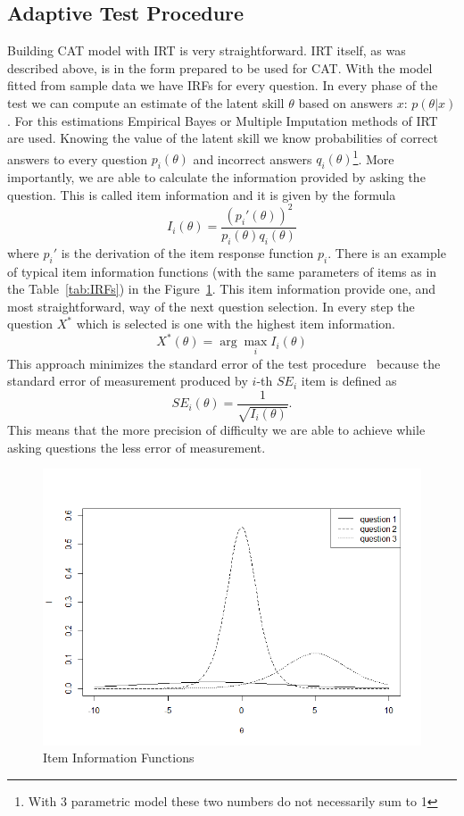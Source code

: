 \subsection{Adaptive Test Procedure}
Building CAT model with IRT is very straightforward. IRT itself, as was described above, is in the form prepared to be used for CAT. With the model fitted from sample data we have IRFs for every question. In every phase of the test we can compute an estimate of the latent skill $\theta$ based on answers $x$: $p(\theta|x)$. For this estimations Empirical Bayes or Multiple Imputation methods of IRT are used. Knowing the value of the latent skill we know probabilities of correct answers to every question $p_i(\theta)$ and incorrect answers $q_i(\theta)$\footnote{With 3 parametric model these two numbers do not necessarily sum to 1}. More importantly, we are able to calculate the information provided by asking the question. This is called item information and it is given by the formula
$$I_i(\theta)=\frac{(p_i'(\theta))^2}{p_i(\theta)q_i(\theta)}$$
where $p_i'$ is the derivation of the item response function $p_i$. There is an example of typical item information functions (with the same parameters of items as in the Table~\ref{tab:IRFs}) in the Figure~\ref{pic:IG}. This item information provide one, and most straightforward, way of the next question selection. In every step the question $X^*$ which is selected is one with the highest item information. 
$$X^*(\theta) = \arg\max_i I_i(\theta)$$
This approach minimizes the standard error of the test procedure~\cite{Hambleton1991} because the standard error of measurement produced by $i$-th $SE_i$ item is defined as
$$SE_i(\theta) = \frac{1}{\sqrt{I_i(\theta)}}.$$
This means that the more precision of difficulty we are able to achieve while asking questions the less error of measurement.

\begin{figure}%
\centering
\includegraphics[width=0.8\columnwidth]{obr/IIs.png}%
\caption{Item Information Functions}%
\label{pic:IG}%
\end{figure}

